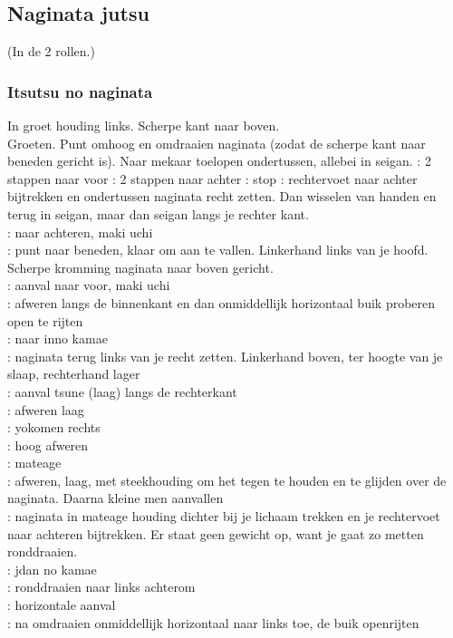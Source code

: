 \subsection{Naginata jutsu}
(In de 2 rollen.)

\subsubsection{Itsutsu no naginata}

In groet houding links. Scherpe kant naar boven.\\
Groeten.
Punt omhoog en omdraaien naginata (zodat de scherpe kant naar beneden gericht is).
Naar mekaar toelopen ondertussen, allebei in seigan.
\pA: 2 stappen naar voor
\pB: 2 stappen naar achter
\pA: stop
\pB: rechtervoet naar achter bijtrekken en ondertussen naginata recht zetten. Dan wisselen van handen en terug in seigan, maar dan seigan langs je rechter kant.\\
\pA: naar achteren, maki uchi\\
\pB: punt naar beneden, klaar om aan te vallen. Linkerhand links van je hoofd. Scherpe kromming naginata naar boven gericht.\\
\pA: aanval naar voor, maki uchi\\
\pB: afweren langs de binnenkant en dan onmiddellijk horizontaal buik proberen open te rijten\\
\pA: naar inno kamae\\
\pB: naginata terug links van je recht zetten. Linkerhand boven, ter hoogte van je slaap, rechterhand lager\\
\pB: aanval tsune (laag) langs de rechterkant\\
\pA: afweren laag\\
\pB: yokomen rechts\\
\pA: hoog afweren\\
\pB: mateage\\
\pA: afweren, laag, met steekhouding om het tegen te houden en te glijden over de naginata. Daarna kleine men aanvallen\\
\pB: naginata in mateage houding dichter bij je lichaam trekken en je rechtervoet naar achteren bijtrekken. Er staat geen gewicht op, want je gaat zo metten ronddraaien.\\
\pA: jdan no kamae\\
\pB: ronddraaien naar links achterom\\
\pA: horizontale aanval\\
\pB: na omdraaien onmiddellijk horizontaal naar links toe, de buik openrijten\\
